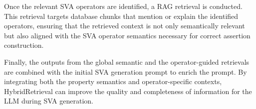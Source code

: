 Once the relevant SVA operators are identified, a RAG retrieval is conducted. 
This retrieval  targets database chunks that mention or explain the identified operators, ensuring that the retrieved context is not only semantically relevant but also aligned with the SVA operator semantics necessary for correct assertion construction.

Finally, the outputs from the global semantic and the operator-guided retrievals are combined with the initial SVA generation prompt to enrich the prompt. 
By integrating both the property semantics and operator-specific contexts, HybridRetrieval can improve the quality and completeness of information for the LLM during SVA generation.






